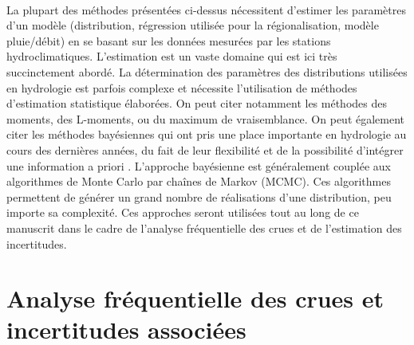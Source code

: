 	\paragraph{} La plupart des méthodes présentées ci-dessus nécessitent d'estimer les paramètres d'un modèle (distribution, régression utilisée pour la régionalisation, modèle pluie/débit) en se basant sur les données mesurées par les stations hydroclimatiques. L'estimation est un vaste domaine qui est ici très succinctement abordé. La détermination des paramètres des distributions utilisées en hydrologie est parfois complexe et nécessite l'utilisation de méthodes d'estimation statistique élaborées. On peut citer notamment les méthodes des moments, des L-moments, ou du maximum de vraisemblance. On peut également citer les méthodes bayésiennes qui ont pris une place importante en hydrologie au cours des dernières années, du fait de leur flexibilité et de la possibilité d'intégrer une information a priori \citep{renard_bayesian_2013}. L'approche bayésienne est généralement couplée aux algorithmes de Monte Carlo par chaînes de Markov (MCMC). Ces algorithmes permettent de générer un grand nombre de réalisations d'une distribution, peu importe sa complexité. Ces approches seront utilisées tout au long de ce manuscrit dans le cadre de l'analyse fréquentielle des crues et de l'estimation des incertitudes. 	
		
	\section*{Analyse fréquentielle des crues et incertitudes associées}
